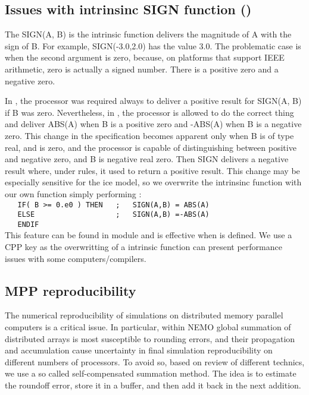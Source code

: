 \documentclass[../main/NEMO_manual]{subfiles}
\begin{document}
\subsection{Issues with intrinsinc SIGN function (\protect{})}
\label{subsec:MISC_sign}

The SIGN(A, B) is the \fortran intrinsic function delivers the magnitude of A with the sign of B.
For example, SIGN(-3.0,2.0) has the value 3.0.
The problematic case is when the second argument is zero, because, on platforms that support IEEE arithmetic,
zero is actually a signed number.
There is a positive zero and a negative zero.

In \fninety, the processor was required always to deliver a positive result for SIGN(A, B) if B was zero.
Nevertheless, in \fninety, the processor is allowed to do the correct thing and deliver ABS(A) when
B is a positive zero and -ABS(A) when B is a negative zero.
This change in the specification becomes apparent only when B is of type real, and is zero,
and the processor is capable of distinguishing between positive and negative zero,
and B is negative real zero.
Then SIGN delivers a negative result where, under \fninety rules, it used to return a positive result.
This change may be especially sensitive for the ice model,
so we overwrite the intrinsinc function with our own function simply performing :   \\
\verb?   IF( B >= 0.e0 ) THEN   ;   SIGN(A,B) = ABS(A)  ?    \\
\verb?   ELSE                   ;   SIGN(A,B) =-ABS(A)     ?  \\
\verb?   ENDIF    ? \\
This feature can be found in  module and is effective when  is defined.
We use a CPP key as the overwritting of a intrinsic function can present performance issues with
some computers/compilers.


\subsection{MPP reproducibility}
\label{subsec:MISC_glosum}

The numerical reproducibility of simulations on distributed memory parallel computers is a critical issue.
In particular, within NEMO global summation of distributed arrays is most susceptible to rounding errors,
and their propagation and accumulation cause uncertainty in final simulation reproducibility on
different numbers of processors.
To avoid so, based on \citet{He_Ding_JSC01} review of different technics,
we use a so called self-compensated summation method.
The idea is to estimate the roundoff error, store it in a buffer, and then add it back in the next addition. 
\end{document}
